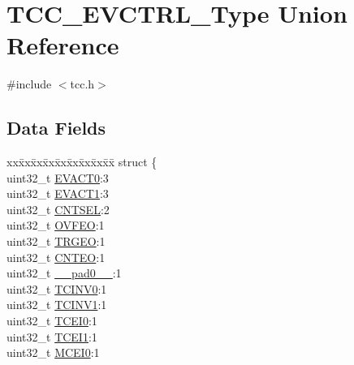 \hypertarget{union_t_c_c___e_v_c_t_r_l___type}{}\section{T\+C\+C\+\_\+\+E\+V\+C\+T\+R\+L\+\_\+\+Type Union Reference}
\label{union_t_c_c___e_v_c_t_r_l___type}


{\ttfamily \#include $<$tcc.\+h$>$}

\subsection*{Data Fields}
\begin{DoxyCompactItemize}
\item 
\begin{tabbing}
xx\=xx\=xx\=xx\=xx\=xx\=xx\=xx\=xx\=\kill
struct \{\\
\>uint32\_t \mbox{\hyperlink{union_t_c_c___e_v_c_t_r_l___type_aefe4c0c552b00ef91b01442d5705d428}{EVACT0}}:3\\
\>uint32\_t \mbox{\hyperlink{union_t_c_c___e_v_c_t_r_l___type_af811781de84778c094c5c7ee9f104a8c}{EVACT1}}:3\\
\>uint32\_t \mbox{\hyperlink{union_t_c_c___e_v_c_t_r_l___type_ac79a86ea3a91f5ce3dfc094f0090772b}{CNTSEL}}:2\\
\>uint32\_t \mbox{\hyperlink{union_t_c_c___e_v_c_t_r_l___type_ae9effc04c8b9ac55bbb786b172816b04}{OVFEO}}:1\\
\>uint32\_t \mbox{\hyperlink{union_t_c_c___e_v_c_t_r_l___type_aeddf239b10227a4de678029a25498ddd}{TRGEO}}:1\\
\>uint32\_t \mbox{\hyperlink{union_t_c_c___e_v_c_t_r_l___type_a81901fd1a1b387ffbe2d8529be0274a5}{CNTEO}}:1\\
\>uint32\_t \mbox{\hyperlink{union_t_c_c___e_v_c_t_r_l___type_a3e57c2ef1c3ffb36722f000cc1156824}{\_\_pad0\_\_}}:1\\
\>uint32\_t \mbox{\hyperlink{union_t_c_c___e_v_c_t_r_l___type_af74c5d9353abe82560f46c2dfe994cba}{TCINV0}}:1\\
\>uint32\_t \mbox{\hyperlink{union_t_c_c___e_v_c_t_r_l___type_a6fe978d078a529e2c5e0ba16224e209f}{TCINV1}}:1\\
\>uint32\_t \mbox{\hyperlink{union_t_c_c___e_v_c_t_r_l___type_a6c5cbccea1a1229343546a590d739ea8}{TCEI0}}:1\\
\>uint32\_t \mbox{\hyperlink{union_t_c_c___e_v_c_t_r_l___type_aa7bacd02af3b540ee39847529d95840f}{TCEI1}}:1\\
\>uint32\_t \mbox{\hyperlink{union_t_c_c___e_v_c_t_r_l___type_ac05965263422f3ee2545fabd9bfead1f}{MCEI0}}:1\\

\end{tabbing}
\end{DoxyCompactItemize}
